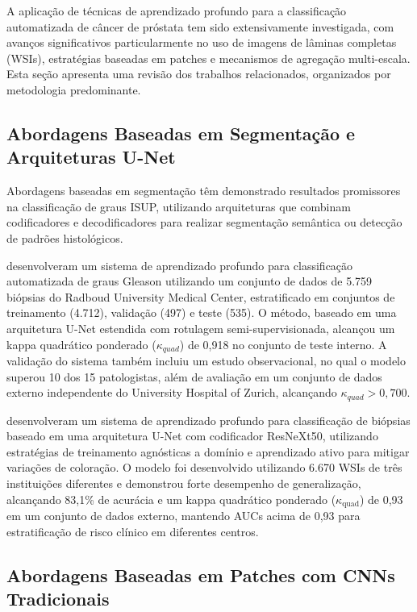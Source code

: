 A aplicação de técnicas de aprendizado profundo para a classificação automatizada de câncer de próstata tem sido extensivamente investigada, com avanços significativos particularmente no uso de imagens de lâminas completas (WSIs), estratégias baseadas em patches e mecanismos de agregação multi-escala. Esta seção apresenta uma revisão dos trabalhos relacionados, organizados por metodologia predominante.

\subsection{Abordagens Baseadas em Segmentação e Arquiteturas U-Net}

Abordagens baseadas em segmentação têm demonstrado resultados promissores na classificação de graus ISUP, utilizando arquiteturas que combinam codificadores e decodificadores para realizar segmentação semântica ou detecção de padrões histológicos.

\cite{ref-bulten2020} desenvolveram um sistema de aprendizado profundo para classificação automatizada de graus Gleason utilizando um conjunto de dados de 5.759 biópsias do Radboud University Medical Center, estratificado em conjuntos de treinamento (4.712), validação (497) e teste (535). O método, baseado em uma arquitetura U-Net estendida com rotulagem semi-supervisionada, alcançou um kappa quadrático ponderado ($\kappa_{quad}$) de 0,918 no conjunto de teste interno. A validação do sistema também incluiu um estudo observacional, no qual o modelo superou 10 dos 15 patologistas, além de avaliação em um conjunto de dados externo independente do University Hospital of Zurich, alcançando $\kappa_{quad} > 0,700$.

\cite{ref-singhal2022} desenvolveram um sistema de aprendizado profundo para classificação de biópsias baseado em uma arquitetura U-Net com codificador ResNeXt50, utilizando estratégias de treinamento agnósticas a domínio e aprendizado ativo para mitigar variações de coloração. O modelo foi desenvolvido utilizando 6.670 WSIs de três instituições diferentes e demonstrou forte desempenho de generalização, alcançando 83,1\% de acurácia e um kappa quadrático ponderado ($\kappa_{\text{quad}}$) de 0,93 em um conjunto de dados externo, mantendo AUCs acima de 0,93 para estratificação de risco clínico em diferentes centros.

\subsection{Abordagens Baseadas em Patches com CNNs Tradicionais}

